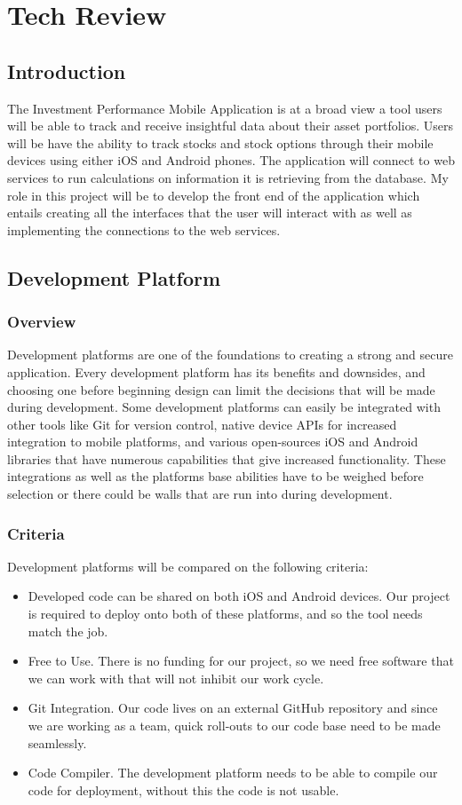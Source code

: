 \documentclass[onecolumn, draftclsnofoot,10pt, compsoc]{IEEEtran}
\begin{document}
\section{Tech Review}
\subsection{Introduction}

The Investment Performance Mobile Application is at a broad view a tool users will be able to track and receive insightful data about their asset portfolios. Users will be have the ability
to track stocks and stock options through their mobile devices using either iOS and Android phones. The application will connect to web services to run calculations on information it is retrieving from the database.
My role in this project will  be to develop the front end of the application which entails creating all the 
interfaces that the user will interact with as well as implementing the connections to the web services.

\subsection{Development Platform}
\subsubsection{Overview}
Development platforms are one of the foundations to creating a strong and secure application. Every development platform has its benefits and downsides, and choosing
one before beginning design can limit the decisions that will be made during development. Some development platforms can easily be integrated with other tools like Git for
version control, native device APIs for increased integration to mobile platforms, and various open-sources iOS and Android libraries that have numerous capabilities that give increased
functionality. These integrations as well as the platforms base abilities have to be weighed before selection or there could be walls that are run into during development.

\subsubsection{Criteria}
Development platforms will be compared on the following criteria:
\begin{itemize}
	\item Developed code can be shared on both iOS and Android devices. Our project is required to deploy onto both of these platforms, and so the tool needs match the job.
	\item Free to Use. There  is no funding for our project, so we need free software that we can work with that will not inhibit our work cycle.
	\item Git Integration. Our code lives on an external GitHub repository and since we are working as a team, quick roll-outs to our code base need to be made seamlessly.
	\item Code Compiler. The development platform needs to be able to compile our code for deployment, without this the code is not usable.
\end{itemize}
\end{document}
